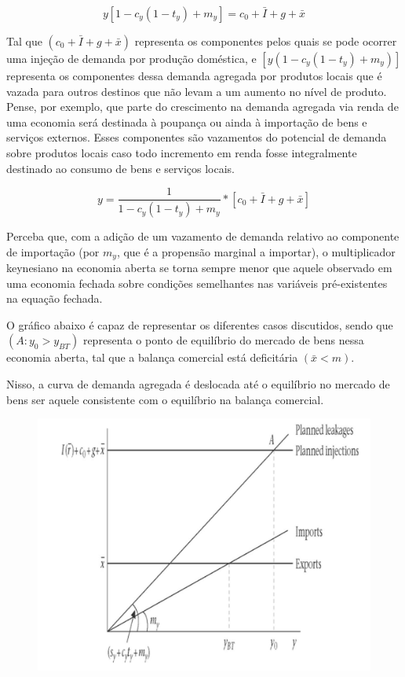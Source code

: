 \documentclass[a4paper,12pt]{article}[abntex2]
\begin{document}
\[
y[1-c_y(1-t_y)+m_y] = c_0 + \bar{I} + g + \bar{x}
\]

Tal que $(c_0+\bar{I}+g+\bar{x})$ representa os componentes pelos quais se pode ocorrer uma injeção de demanda por produção doméstica, e $\left[y(1-c_y(1-t_y)+m_y)\right]$ representa os componentes dessa demanda agregada por produtos locais que é vazada para outros destinos que não levam a um aumento no nível de produto.  
Pense, por exemplo, que parte do crescimento na demanda agregada via renda de uma economia será destinada à poupança ou ainda à importação de bens e serviços externos.  
Esses componentes são vazamentos do potencial de demanda sobre produtos locais caso todo incremento em renda fosse integralmente destinado ao consumo de bens e serviços locais.

\[
y = \frac{1}{1-c_y(1-t_y)+m_y} \ast \left[c_0 + \bar{I} + g + \bar{x}\right]
\]


Perceba que, com a adição de um vazamento de demanda relativo ao componente de importação (por $m_y$, que é a propensão marginal a importar), o multiplicador keynesiano na economia aberta se torna sempre menor que aquele observado em uma economia fechada sobre condições semelhantes nas variáveis pré-existentes na equação fechada.


O gráfico abaixo é capaz de representar os diferentes casos discutidos, sendo que $(A: y_0 > y_{BT})$ representa o ponto de equilíbrio do mercado de bens nessa economia aberta, tal que a balança comercial está deficitária $(\bar{x}<m)$.  

Nisso, a curva de demanda agregada é deslocada até o equilíbrio no mercado de bens ser aquele consistente com o equilíbrio na balança comercial.

\begin{figure}[H]
    \centering
    \includegraphics[width=0.7\linewidth]{Imagens/a20i1.png}
\end{figure}
\end{document}

